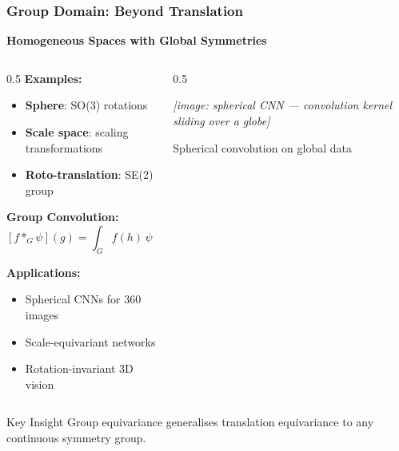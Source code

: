 \begin{frame}[fragile]\frametitle{Group Domain: Beyond Translation}

\begin{center}
\textbf{Homogeneous Spaces with Global Symmetries}
\end{center}

\begin{columns}
\begin{column}{0.5\textwidth}
\textbf{Examples:}
\begin{itemize}
\item \textbf{Sphere}: SO(3) rotations
\item \textbf{Scale space}: scaling transformations
\item \textbf{Roto-translation}: SE(2) group
\end{itemize}

\textbf{Group Convolution:}
$$[f *_G \psi](g) = \int_G f(h)\, \psi(g^{-1}h)\, dh$$

\textbf{Applications:}
\begin{itemize}
\item Spherical CNNs for 360\textdegree{} images
\item Scale-equivariant networks
\item Rotation-invariant 3D vision
\end{itemize}
\end{column}
\begin{column}{0.5\textwidth}
\begin{center}
\textit{[image: spherical CNN --- convolution kernel sliding over a globe]}

\vspace{0.3cm}
{\small Spherical convolution on global data}
\end{center}
\end{column}
\end{columns}

\begin{block}{Key Insight}
Group equivariance generalises translation equivariance to any continuous symmetry group.
\end{block}

\end{frame}

